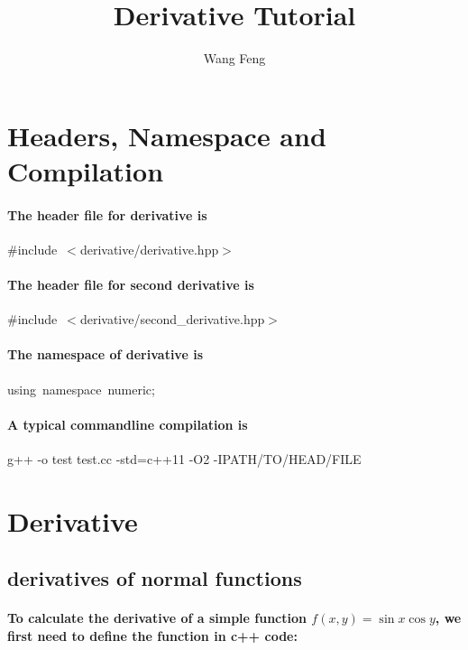 \documentclass[9pt,onside,a4paper]{article}
\author{Wang Feng}
\title{Derivative Tutorial}
\newcommand{\hlstd}[1]{\textcolor[rgb]{0.2,0,0.4}{#1}}
\newcommand{\hlppc}[1]{\textcolor[rgb]{0.33,0.45,0.69}{#1}}
\newcommand{\hlopt}[1]{\textcolor[rgb]{0.33,0.33,0.33}{#1}}
\newcommand{\hlkwa}[1]{\textcolor[rgb]{1,0.19,0.19}{#1}}
\newcommand{\hlred}[1]{\textcolor[rgb]{1.0,0.0,0.0}{#1}}
\begin{document}

\section{Headers, Namespace and Compilation}

\paragraph{The header file for derivative is\\}
\hlstd{}\hlppc{\#include\ $<$derivative/derivative.hpp$>$}

\paragraph{The header file for second derivative is\\}
\hlstd{}\hlppc{\#include\ $<$derivative/second\_derivative.hpp$>$}

\paragraph{The namespace of derivative is\\}
\hlstd{}\hlkwa{using\ namespace\ }{numeric}\hlopt{;}\hspace*{\fill} 

\paragraph{A typical commandline compilation is\\}
\hlstd{}g++ -o test test.cc -std=c++11 -O2 -I\hlred{PATH/TO/HEAD/FILE}

\section{Derivative}

\subsection{derivatives of normal functions}

\paragraph{To calculate the derivative of a simple function $ f(x,y) = \sin x \cos y $, we first need to define the function in c++ code:}
\end{document}

